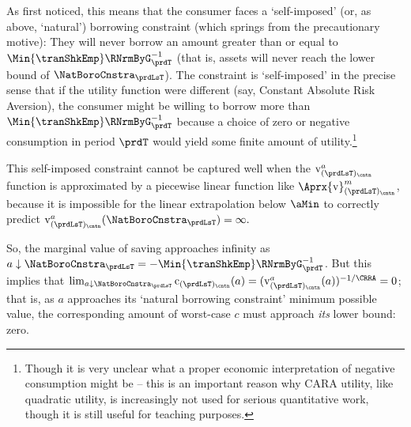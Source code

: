 \documentclass[titlepage, headings=optiontotocandhead]{econtex}
\begin{document}
As \cite{zeldesStochastic} first noticed, this means that the consumer faces a `self-imposed' (or, as above, `natural') borrowing constraint (which springs from the precautionary motive): They will never borrow an amount greater than or equal to $\Min{\tranShkEmp}\RNrmByG_{\prdT}^{-1}$ (that is, assets will never reach the lower bound of $\NatBoroCnstra_{\prdLsT}$).  The constraint is `self-imposed' in the precise sense that if the utility function were different (say, Constant Absolute Risk Aversion), the consumer might be willing to borrow more than $\Min{\tranShkEmp}\RNrmByG_{\prdT}^{-1}$ because a choice of zero or negative consumption in period $\prdT$ would yield some finite amount of utility.\footnote{Though it is very unclear what a proper economic interpretation of negative consumption might be -- this is an important reason why CARA utility, like quadratic utility, is increasingly not used for serious quantitative work, though it is still useful for teaching purposes.}

This self-imposed constraint cannot be captured well when the $\mathrm{v}^{a}_{(\prdLsT)_\cntn}$ function is approximated by a piecewise linear function like $\Aprx{\mathrm{v}}^{m}_{(\prdLsT)_\cntn}$, because it is impossible for the linear extrapolation below $\aMin$ to correctly predict $\mathrm{v}^{a}_{(\prdLsT)_\cntn}(\NatBoroCnstra_{\prdLsT})=\infty.$ %


So, the marginal value of saving approaches infinity as $a \downarrow \NatBoroCnstra_{\prdLsT}=-\Min{\tranShkEmp}\RNrmByG_{\prdT}^{-1}$.  But this implies that $\lim_{a \downarrow \NatBoroCnstra_{\prdLsT}} \mathrm{c}_{(\prdLsT)_\cntn}(a) = (\mathrm{v}^{a}_{(\prdLsT)_\cntn}(a))^{-1/\CRRA} = 0$; that is, as $a$ approaches its `natural borrowing constraint' minimum possible value, the corresponding amount of worst-case $c$ must approach \textit{its} lower bound: zero.
\end{document}
